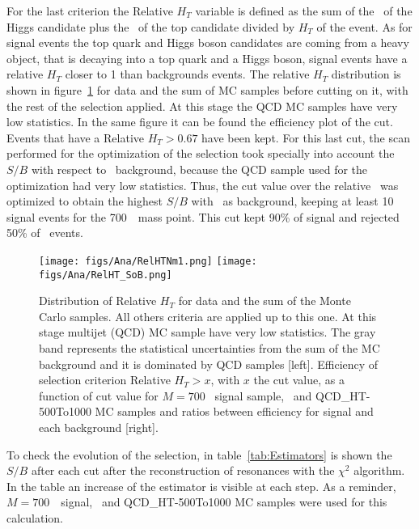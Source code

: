 For the last criterion the Relative $H_{T}$ variable is defined as the sum of the \pt~of the Higgs candidate plus the \pt~of the top candidate divided by $H_{T}$ of the event. As for signal events the top quark and Higgs boson candidates are coming from a heavy object, that is decaying into a top quark and a Higgs boson, signal events have a relative $H_{T}$ closer to 1 than backgrounds events. The relative $H_{T}$ distribution is shown in figure~\ref{fig:RelHtMass} for data and the sum of MC samples before cutting on it, with the rest of the selection applied. At this stage the QCD MC samples have very low statistics. In the same figure it can be found the efficiency plot of the cut. Events that have a Relative $H_{T}>0.67$ have been kept. For this last cut, the scan performed for the optimization of the selection took specially into account the $S/B$ with respect to \ttbar~background, because the QCD sample used for the optimization had very low statistics. Thus, the cut value over the relative \HT~was optimized to obtain the highest $S/B$ with \ttbar~as background, keeping at least 10 signal events for the 700~\GeVcc~mass point. This cut kept 90\% of signal and rejected 50\% of \ttbar~events.

\begin{figure}[!Hhtbp]
  \begin{center}
    \texttt{[image: figs/Ana/RelHTNm1.png]}
    \texttt{[image: figs/Ana/RelHT\_SoB.png]}
    \caption{Distribution of Relative $H_{T}$ for data and the sum of the Monte Carlo samples. All others criteria are applied up to this one. At this stage multijet (QCD) MC sample have very low statistics. The gray band represents the statistical uncertainties from the sum of the MC background and it is dominated by QCD samples [left]. Efficiency of selection criterion Relative $H_{T}>x$, with $x$ the cut value, as a function of cut value for $M=700$ \GeVcc~signal sample, \ttbar~and QCD\_HT-500To1000 MC samples and ratios between efficiency for signal and each background [right]. }
    \label{fig:RelHtMass}
  \end{center}
\end{figure}

To check the evolution of the selection, in table~\ref{tab:Estimators} is shown the $S/B$ after each cut after the reconstruction of resonances with the $\chi^{2}$ algorithm. In the table an increase of the estimator is visible at each step. As a reminder, ${M=700}$~\GeVcc~signal, \ttbar~and QCD\_HT-500To1000 MC samples were used for this calculation. %

